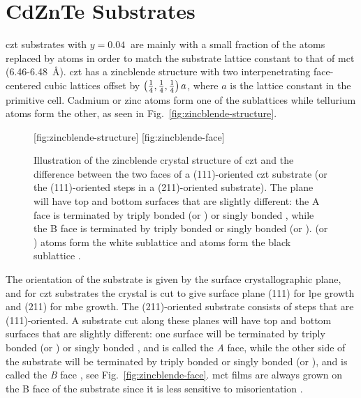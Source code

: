 \section{CdZnTe Substrates}

\Acl{czt} substrates with $y=\SI{0.04}{}$ are mainly  with a small fraction of the  atoms replaced by  atoms in order to match the substrate lattice constant to that of \acl{mct} (\SI{6.46}{}-\SI{6.48}{\angstrom}). \Ac{czt} has a zincblende structure with two interpenetrating face-centered cubic lattices offset by $\left( \frac{1}{4},\frac{1}{4},\frac{1}{4} \right)a$, where $a$ is the lattice constant in the primitive cell. Cadmium or zinc atoms form one of the sublattices while tellurium atoms form the other, as seen in Fig.~\ref{fig:zincblende-structure}.

\begin{figure}[htbp]
    \centering
    [fig:zincblende-structure]
    \hfill
    [fig:zincblende-face]
    \caption[Crystal structure of \ac{czt}.]{Illustration of  the zincblende crystal structure of \ac{czt} and  the difference between the two faces of a (111)-oriented \ac{czt} substrate (or the (111)-oriented steps in a (211)-oriented substrate). The plane will have top and bottom surfaces that are slightly different: the A face is terminated by triply bonded  (or ) or singly bonded , while the B face is terminated by triply bonded  or singly bonded  (or ).  (or ) atoms form the white sublattice and  atoms form the black sublattice \citep[Adapted from][]{sivananthan1986relation}.}
    \label{fig:zincblende}
\end{figure}

The orientation of the substrate is given by the surface crystallographic plane, and for \ac{czt} substrates the crystal is cut to give surface plane (111) for \ac{lpe} growth and (211) for \ac{mbe} growth. The (211)-oriented substrate consists of steps that are (111)-oriented. A substrate cut along these planes will have top and bottom surfaces that are slightly different: one surface will be terminated by triply bonded  (or ) or singly bonded , and is called the \emph{A} face, while the other side of the substrate will be terminated by triply bonded  or singly bonded  (or ), and is called the \emph{B} face \citep{sivananthan1986relation}, see Fig.~\ref{fig:zincblende-face}. \Ac{mct} films are always grown on the B face of the substrate since it is less sensitive to misorientation \citep{parker1988terracing, edwall1984liquid}.%


